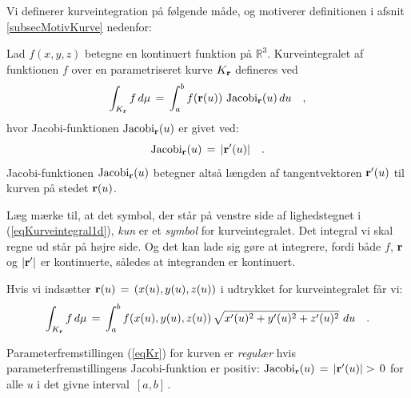 Vi definerer kurveintegration på følgende måde, og motiverer definitionen i afsnit \ref{subsecMotivKurve} nedenfor:


\begin{definition}[Kurveintegral] \label{defKurveInt}
Lad $f(x,y,z)$ betegne en kontinuert funktion på $\mathbb{R}^{3}$.
{Kurveintegralet} af funk\-tio\-nen $f$ over en {parametriseret kurve}
$K_{\bf r}$ defineres ved
\begin{equation} \label{eqKurveintegral1d}
\int_{K_{\bf r}} f \, d\mu \, = \, \int_{a}^{b} f({\bf
r}(u))\,\operatorname{Jacobi}_{\bf r}(u)\,du \quad ,
\end{equation}
hvor {Jacobi-funktionen $\operatorname{Jacobi}_{\bf r}(u)$} er givet ved:
\begin{equation}
\operatorname{Jacobi}_{\bf r}(u) \, = \,  | {\bf r}'(u) | \quad .
\end{equation}
Jacobi-funktionen $\operatorname{Jacobi}_{\bf r}(u)$ betegner altså længden af tangentvektoren ${\bf r}'(u)$ til kurven på stedet
${\bf r}(u)$.
\end{definition}

\begin{aha}
Læg mærke til, at det symbol, der står på venstre side af
lighedstegnet i (\ref{eqKurveintegral1d}), {\em kun} er et {\em
symbol} for kurveintegralet. Det integral vi skal regne ud står på
højre side. Og det kan lade sig gøre at integrere, fordi både $f$,
${\bf r}$ og $ | {\bf r}' | $ er
 kontinuerte, således at integranden er kontinuert.
\end{aha}

Hvis vi indsætter ${\bf r}(u) \, = \, \left(x(u), y(u), z(u)\right)$ i udtrykket for
kurveintegralet får vi:
\begin{equation}
\int_{K_{\bf r}} f \, d\mu \, = \, \int_{a}^{b} f(x(u), y(u), z(u)
)\,\sqrt{x'(u)^{2} + y'(u)^{2} + z'(u)^{2}}\,\,du \quad.
\end{equation}



\begin{remark}
Parameterfremstillingen (\ref{eqKr}) for kurven
er \emph{regulær} hvis parameterfremstillingens
Jacobi-funktion er positiv: $\operatorname{Jacobi}_{\bf r}(u) \, = \, | {\bf r}'(u) |
> \, 0 $ for alle $u$ i det givne interval $\,[a,
b]\,$.
\end{remark}



